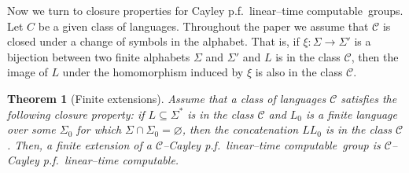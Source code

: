 \documentclass[article,12pt]{elsarticle}
\newtheorem{theorem}{Theorem}
\newcommand\ClinearC{$\mathcal{C}$--Cayley p.f.~linear--time computable}
\newcommand\linearC{Cayley p.f.~linear--time computable}
\begin{document}
Now we turn to closure properties for 
\linearC\ groups.     
Let $C$ be a given class of languages.  
Throughout the paper we assume that   
$\mathcal{C}$ is closed under a change of 
symbols in the alphabet. 
That is, if $\xi: \Sigma \rightarrow \Sigma'$ is 
a bijection  between two finite alphabets $\Sigma$ and 
$\Sigma'$ and $L$ is in the class $\mathcal{C}$, then 
the image of $L$ under the homomorphism 
induced by $\xi$ is also in the class $\mathcal{C}$.    
\begin{theorem}[Finite extensions] 
	\label{finiteextensionthm}
	Assume that a class of languages 
	$\mathcal{C}$ satisfies the 
	following closure property:  
	if $L \subseteq \Sigma^*$ is in the class $\mathcal{C}$ 
	and $L_0$ is a finite language 
	over some $\Sigma_0$ for which $\Sigma \cap \Sigma_0 = \varnothing$, then the concatenation 
	$LL_0$ is in the class $\mathcal{C}$.    
	Then, a finite extension of a 
	\ClinearC\ 
	group is \ClinearC.  
\end{theorem}	
\end{document}
